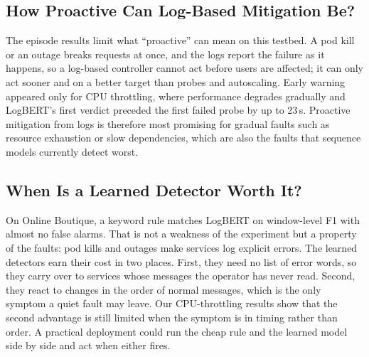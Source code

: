 \documentclass[journal]{IEEEtran}
\begin{document}
\subsection{How Proactive Can Log-Based Mitigation Be?}
The episode results limit what ``proactive'' can mean on this testbed. A pod kill or an outage breaks requests at once, and the logs report the failure as it happens, so a log-based controller cannot act before users are affected; it can only act sooner and on a better target than probes and autoscaling. Early warning appeared only for CPU throttling, where performance degrades gradually and LogBERT's first verdict preceded the first failed probe by up to 23\,s. Proactive mitigation from logs is therefore most promising for gradual faults such as resource exhaustion or slow dependencies, which are also the faults that sequence models currently detect worst.

\subsection{When Is a Learned Detector Worth It?}
On Online Boutique, a keyword rule matches LogBERT on window-level F1 with almost no false alarms. That is not a weakness of the experiment but a property of the faults: pod kills and outages make services log explicit errors. The learned detectors earn their cost in two places. First, they need no list of error words, so they carry over to services whose messages the operator has never read. Second, they react to changes in the order of normal messages, which is the only symptom a quiet fault may leave. Our CPU-throttling results show that the second advantage is still limited when the symptom is in timing rather than order. A practical deployment could run the cheap rule and the learned model side by side and act when either fires.
\end{document}
